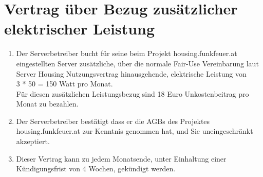 \documentclass[parskip=half]{scrreprt}
\begin{document}
\chapter*{Vertrag über Bezug zusätzlicher elektrischer Leistung}


\begin{contract}
\begin{enumerate}
\item Der Serverbetreiber bucht für seine beim Projekt housing.funkfeuer.at eingestellten Server zusätzliche, über die normale Fair-Use Vereinbarung laut Server Housing Nutzungsvertrag hinausgehende, elektrische Leistung von
\vspace{0.2cm}\\
\hspace*{3mm}3 * 50 = 150 Watt pro Monat.
\vspace{0.2cm}\\
Für diesen zusätzlichen Leistungsbezug sind 18 Euro Unkostenbeitrag pro Monat zu bezahlen.
\item Der Serverbetreiber bestätigt dass er die AGBs des Projektes housing.funkfeuer.at zur Kenntnis genommen hat, und Sie uneingeschränkt akzeptiert.
\item Dieser Vertrag kann zu jedem Monatsende, unter Einhaltung einer Kündigungsfrist von 4 Wochen, gekündigt werden.
\end{enumerate}
\end{contract}


\end{document}

